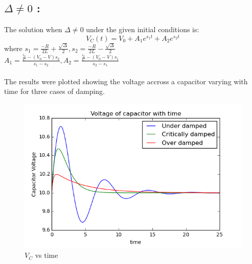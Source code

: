 \documentclass[12pt, a4paper]{report}
\begin{document}
\subsection*{$\Delta \ne 0$ :}
The solution when $\Delta \ne 0$ under the given initial conditions is:
\begin{equation}
 V_C(t) = V_0 + A_1e^{s_1t} + A_2e^{s_2t}
\end{equation}
where $s_1 = \frac{-R}{2L} + \frac{\sqrt{\Delta}}{2} , s_2 = \frac{-R}{2L} - \frac{\sqrt{\Delta}}{2}$ \\
$A_1 = \frac{\frac{i_0}{C} - (V_0 - V)s_2}{s_1 - s_2} , A_2 = \frac{\frac{i_0}{C} - (V_0 - V)s_1}{s_2 - s_1}$ \\
\\

The results were plotted showing the voltage accross a capacitor varying with time for three cases of damping.
\begin{figure}[H]
 \centering
 \includegraphics[width = \textwidth]{VC.png}
 \caption{$V_C$ vs time}
 \label{VC}
\end{figure}
\end{document}
